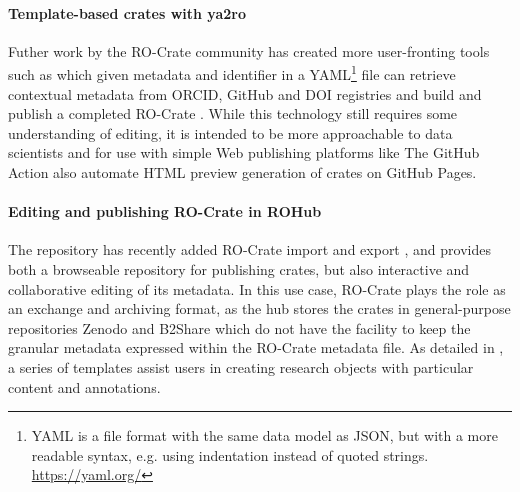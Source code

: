 \paragraph{Template-based crates with ya2ro}
Futher work by the RO-Crate community has created more user-fronting tools such as  which given metadata and identifier in a YAML\footnote{
  YAML is a file format with the same data model as JSON, but with a more readable syntax, e.g. using indentation instead of quoted strings.  \url{https://yaml.org/}} 
file can retrieve contextual metadata from ORCID, GitHub and DOI registries and build and publish a completed RO-Crate \cite{ya2ro}.   
While this technology still requires some understanding of editing, it is intended to be more approachable to data scientists and for use with simple Web publishing platforms like  The GitHub Action  also automate HTML preview generation of crates on GitHub Pages.

\paragraph{Editing and publishing RO-Crate in ROHub}
The repository  \cite{ch5-48} has recently added RO-Crate import and export \cite{Fouilloux 2023}, and provides both a browseable repository for publishing crates, but also interactive and collaborative editing of its metadata. 
In this use case, RO-Crate plays the role as an exchange and archiving format, as the hub stores the crates in general-purpose repositories Zenodo and B2Share which do not have the facility to keep the granular metadata expressed within the RO-Crate metadata file. As detailed in \cite{Fouilloux 2023}, a series of templates assist users in creating research objects with particular content and annotations. 

